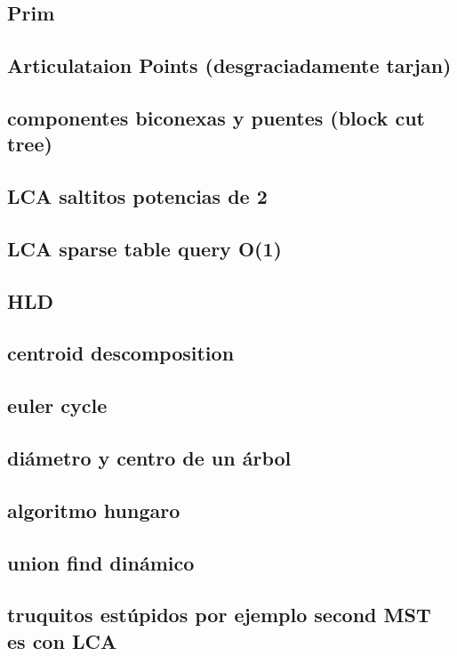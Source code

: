 \subsection{Prim}
\subsection{Articulataion Points (desgraciadamente tarjan)}
\subsection{componentes biconexas y puentes (block cut tree)}

\subsection{ LCA saltitos potencias de 2}
\subsection{LCA sparse table query O(1)}
\subsection{HLD}
\subsection{centroid descomposition}
\subsection{euler cycle}
\subsection{diámetro y centro de un árbol}
\subsection{algoritmo hungaro}
\subsection{union find dinámico}
\subsection{truquitos estúpidos por ejemplo second MST es con LCA }
